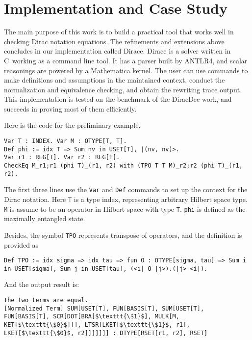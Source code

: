 \documentclass[runningheads]{llncs}
\newcommand{\CC}{C\nolinebreak\hspace{-.05em}\raisebox{.4ex}{\tiny\bf +}\nolinebreak\hspace{-.10em}\raisebox{.4ex}{\tiny\bf +}}
\def\CC{{C\nolinebreak[4]\hspace{-.05em}\raisebox{.4ex}{\tiny\bf ++}}}
\begin{document}




\section{Implementation and Case Study}

The main purpose of this work is to build a practical tool that works well in checking Dirac notation equations. The refinements and extensions above concludes in our implementation called Dirace. Dirace is a solver written in \CC\ working as a command line tool. It has a parser built by ANTLR4, and scalar reasonings are powered by a Mathematica kernel. The user can use commands to make definitions and assumptions in the maintained context, conduct the normalization and equivalence checking, and obtain the rewriting trace output. This implementation 
is tested on the benchmark of the DiracDec work, and succeeds in proving most of them efficiently.

Here is the code for the preliminary example.

    \begin{lstlisting}[style=dirace]
Var T : INDEX. Var M : OTYPE[T, T].
Def phi := idx T => Sum nv in USET[T], |(nv, nv)>.
Var r1 : REG[T]. Var r2 : REG[T].
CheckEq M_r1;r1 (phi T)_(r1, r2) with (TPO T T M)_r2;r2 (phi T)_(r1, r2).
    \end{lstlisting}        

The first three lines use the \texttt{Var} and \texttt{Def} commands to set up the context for the Dirac notation.
Here \texttt{T} is a type index, representing arbitrary Hilbert space type. \texttt{M} is assume to be an operator in Hilbert space with type \texttt{T}. \texttt{phi} is defined as the maximally entangled state.

Besides, the symbol \texttt{TPO} represents transpose of operators, and the definition is provided as
\begin{lstlisting}[style=dirace]
Def TPO := idx sigma => idx tau => fun O : OTYPE[sigma, tau] => Sum i in USET[sigma], Sum j in USET[tau], (<i| O |j>).(|j> <i|).
\end{lstlisting}


And the output result is:
    \begin{lstlisting}[style=dirace]
The two terms are equal.
[Normalized Term] SUM[USET[T], FUN[BASIS[T], SUM[USET[T], FUN[BASIS[T], SCR[DOT[BRA[$\texttt{\$1}$], MULK[M, KET[$\texttt{\$0}$]]], LTSR[LKET[$\texttt{\$1}$, r1], LKET[$\texttt{\$0}$, r2]]]]]]] : DTYPE[RSET[r1, r2], RSET]
    \end{lstlisting}
\end{document}
